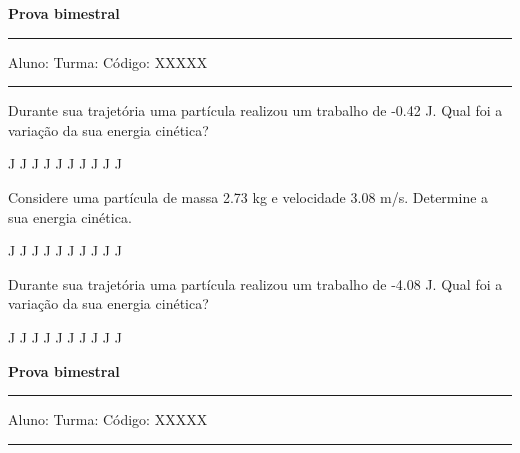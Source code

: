 \documentclass[addpoints]{exam}
\begin{document}
        
\begin{center}
	{\bf \Huge Prova bimestral}
	\vspace{1cm} \hrule \vspace{0.5cm}
	Aluno: \hfill Turma: \hfill Código: XXXXX
	\vspace{0.5cm} \hrule \vspace{0.5cm}
\end{center}

        \begin{questions}
\question[33] Durante sua trajetória uma partícula realizou um trabalho de   -0.42 J. Qual foi a variação da sua energia cinética?
\linebreak\linebreak

\begin{oneparchoices}
 J J J J J J J J J J\end{oneparchoices}
\question[23] Considere uma partícula de massa    2.73 kg e velocidade    3.08 m/s. Determine a sua energia cinética.
\linebreak\linebreak

\begin{oneparchoices}
 J J J J J J J J J J\end{oneparchoices}
\question[11] Durante sua trajetória uma partícula realizou um trabalho de   -4.08 J. Qual foi a variação da sua energia cinética?
\linebreak\linebreak

\begin{oneparchoices}
 J J J J J J J J J J\end{oneparchoices}
\end{questions}
\newpage
\begin{center}
	{\bf \Huge Prova bimestral}
	\vspace{1cm} \hrule \vspace{0.5cm}
	Aluno: \hfill Turma: \hfill Código: XXXXX
	\vspace{0.5cm} \hrule \vspace{0.5cm}
\end{center}
\end{document}
